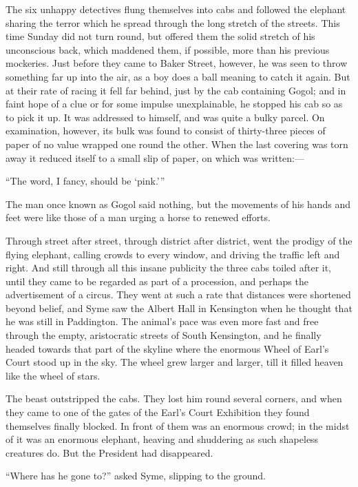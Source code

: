 The six unhappy detectives flung themselves into cabs and followed the elephant sharing the terror which he spread through the long stretch of the streets. This time Sunday did not turn round, but offered them the solid stretch of his unconscious back, which maddened them, if possible, more than his previous mockeries. Just before they came to Baker Street, however, he was seen to throw something far up into the air, as a boy does a ball meaning to catch it again. But at their rate of racing it fell far behind, just by the cab containing Gogol; and in faint hope of a clue or for some impulse unexplainable, he stopped his cab so as to pick it up. It was addressed to himself, and was quite a bulky parcel. On examination, however, its bulk was found to consist of thirty-three pieces of paper of no value wrapped one round the other. When the last covering was torn away it reduced itself to a small slip of paper, on which was written:⁠—

    “The word, I fancy, should be ‘pink.’ ”

The man once known as Gogol said nothing, but the movements of his hands and feet were like those of a man urging a horse to renewed efforts.

Through street after street, through district after district, went the prodigy of the flying elephant, calling crowds to every window, and driving the traffic left and right. And still through all this insane publicity the three cabs toiled after it, until they came to be regarded as part of a procession, and perhaps the advertisement of a circus. They went at such a rate that distances were shortened beyond belief, and Syme saw the Albert Hall in Kensington when he thought that he was still in Paddington. The animal’s pace was even more fast and free through the empty, aristocratic streets of South Kensington, and he finally headed towards that part of the skyline where the enormous Wheel of Earl’s Court stood up in the sky. The wheel grew larger and larger, till it filled heaven like the wheel of stars.

The beast outstripped the cabs. They lost him round several corners, and when they came to one of the gates of the Earl’s Court Exhibition they found themselves finally blocked. In front of them was an enormous crowd; in the midst of it was an enormous elephant, heaving and shuddering as such shapeless creatures do. But the President had disappeared.

“Where has he gone to?” asked Syme, slipping to the ground.

